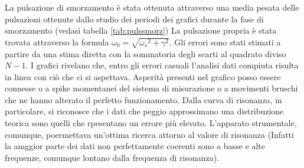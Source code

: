 La pulsazione di smorzamento è stata ottenuta attraverso una media pesata delle pulsazioni ottenute dallo studio dei periodi dei
grafici durante la fase di smorzamento (vedasi tabella \ref{tab:pulssmorz})
La pulsazione propria è stata trovata attraverso la formula $\omega_0 =\sqrt{{\omega_s} ^ 2 + \gamma ^ 2 }$.
Gli errori sono stati stimati a partire da una stima diretta con la sommatoria degli scarti al quadrato diviso $N-1$.
I grafici rivelano che, entro gli errori casuali l'analisi dati compiuta risulta in linea con ciò che ci si aspettava. Asperità 
presenti nel grafico posso essere connesse o a spike momentanei del sistema di misurazione o a movimenti bruschi che ne hanno
 alterato il perfetto funzionamento. Dalla curva di risonanza, in particolare, si riconosce che i dati che peggio approssimano una
 distribuzione teorica sono quelli che rpesentano un errore più elevato. L'apparato strumentale, comunque, poermettava un'ottima
 ricerca attorno al valore di risonanza (Infatti la amggior parte dei dati non perfettamente coerenti sono a basse e alte frequenze,
 comunque lontano dalla frequenza di risonanza).

